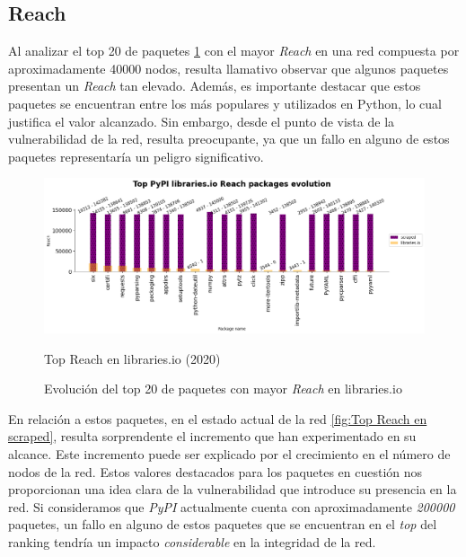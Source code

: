 \subsection{Reach}

Al analizar el top 20 de paquetes \ref{fig:Top Reach en libraries.io} con el mayor \textit{Reach} en una
red compuesta por aproximadamente 40000 nodos, resulta llamativo observar que algunos paquetes
presentan un \textit{Reach} tan elevado. Además, es importante destacar que estos paquetes se
encuentran entre los más populares y utilizados en Python, lo cual justifica el valor alcanzado.
Sin embargo, desde el punto de vista de la vulnerabilidad de la red, resulta preocupante, ya que
un fallo en alguno de estos paquetes representaría un peligro significativo.

\begin{figure}[ht!]
    \begin{center}
        \includegraphics[width=1\textwidth]{img/pypi/top_librariesio_reach_evolution.png}
        \caption{Top Reach en libraries.io (2020)}
    \end{center}
    \label{fig:Top Reach en libraries.io}
    \caption{Evolución del top 20 de paquetes con mayor \textit{Reach} en libraries.io}
\end{figure}

En relación a estos paquetes, en el estado actual de la red \ref{fig:Top Reach en scraped}, resulta sorprendente el incremento
que han experimentado en su alcance. Este incremento puede ser explicado por el crecimiento en el
número de nodos de la red. Estos valores destacados para los paquetes en cuestión nos proporcionan
una idea clara de la vulnerabilidad que introduce su presencia en la red. Si consideramos que
\textit{PyPI} actualmente cuenta con aproximadamente \textit{200000} paquetes, un fallo en alguno de estos paquetes
que se encuentran en el \textit{top} del ranking tendría un impacto \textit{considerable} en la integridad de la red.


